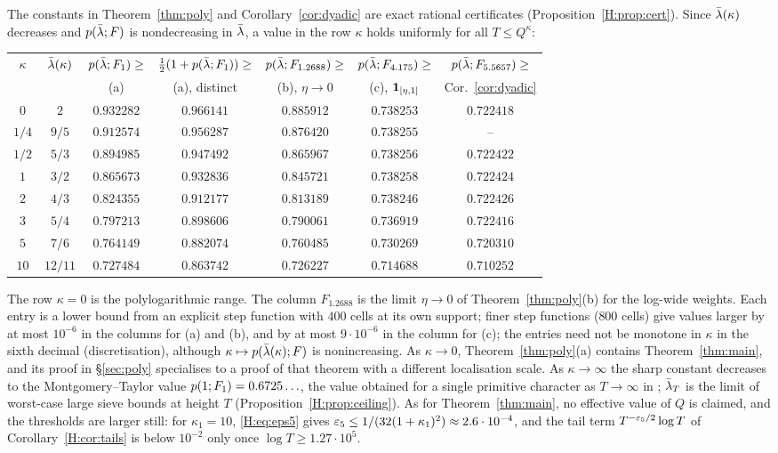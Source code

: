 \documentclass[11pt]{amsart}
\theoremstyle{definition}
\theoremstyle{remark}
\numberwithin{equation}{section}
\begin{document}
The constants in Theorem~\ref{thm:poly} and Corollary~\ref{cor:dyadic} are exact rational certificates (Proposition~\ref{H:prop:cert}). Since $\bar\lambda(\kappa)$ decreases and $p(\bar\lambda;F)$ is nondecreasing in $\bar\lambda$, a value in the row $\kappa$ holds uniformly for all $T\le Q^\kappa$:
\begin{center}\footnotesize\setlength{\tabcolsep}{4pt}
\begin{tabular}{@{}ccccccc@{}}
\toprule
$\kappa$ & $\bar\lambda(\kappa)$ & $p(\bar\lambda;F_1)\ge$ & $\frac12(1+p(\bar\lambda;F_1))\ge$ & $p(\bar\lambda;F_{1.2688})\ge$ & $p(\bar\lambda;F_{4.175})\ge$ & $p(\bar\lambda;F_{5.5657})\ge$ \\
& & (a) & (a), distinct & (b), $\eta\to0$ & (c), $\mathbf 1_{[\eta,1]}$ & Cor.~\ref{cor:dyadic}\\
\midrule
$0$ & $2$ & $0.932282$ & $0.966141$ & $0.885912$ & $0.738253$ & $0.722418$\\
$1/4$ & $9/5$ & $0.912574$ & $0.956287$ & $0.876420$ & $0.738255$ & --\\
$1/2$ & $5/3$ & $0.894985$ & $0.947492$ & $0.865967$ & $0.738256$ & $0.722422$\\
$1$ & $3/2$ & $0.865673$ & $0.932836$ & $0.845721$ & $0.738258$ & $0.722424$\\
$2$ & $4/3$ & $0.824355$ & $0.912177$ & $0.813189$ & $0.738246$ & $0.722426$\\
$3$ & $5/4$ & $0.797213$ & $0.898606$ & $0.790061$ & $0.736919$ & $0.722416$\\
$5$ & $7/6$ & $0.764149$ & $0.882074$ & $0.760485$ & $0.730269$ & $0.720310$\\
$10$ & $12/11$ & $0.727484$ & $0.863742$ & $0.726227$ & $0.714688$ & $0.710252$\\
\bottomrule
\end{tabular}
\end{center}
The row $\kappa=0$ is the polylogarithmic range. The column $F_{1.2688}$ is the limit $\eta\to0$ of Theorem~\ref{thm:poly}(b) for the log-wide weights. Each entry is a lower bound from an explicit step function with $400$ cells at its own support; finer step functions ($800$ cells) give values larger by at most $10^{-6}$ in the columns for (a) and (b), and by at most $9\cdot10^{-6}$ in the column for (c); the entries need not be monotone in $\kappa$ in the sixth decimal (discretisation), although $\kappa\mapsto p(\bar\lambda(\kappa);F)$ is nonincreasing. As $\kappa\to0$, Theorem~\ref{thm:poly}(a) contains Theorem~\ref{thm:main}, and its proof in \S\ref{sec:poly} specialises to a proof of that theorem with a different localisation scale. As $\kappa\to\infty$ the sharp constant decreases to the Montgomery--Taylor value $p(1;F_1)=0.6725\ldots$, the value obtained for a single primitive character as $T\to\infty$ in \cite[Theorem~B]{AF26}; $\bar\lambda_T$ is the limit of worst-case large sieve bounds at height $T$ (Proposition~\ref{H:prop:ceiling}). As for Theorem~\ref{thm:main}, no effective value of $Q$ is claimed, and the thresholds are larger still: for $\kappa_1=10$, \eqref{H:eq:eps5} gives $\varepsilon_5\le1/(32(1+\kappa_1)^2)\approx2.6\cdot10^{-4}$, and the tail term $T^{-\varepsilon_5/2}\log T$ of Corollary~\ref{H:cor:tails} is below $10^{-2}$ only once $\log T\ge1.27\cdot10^5$.
\end{document}
